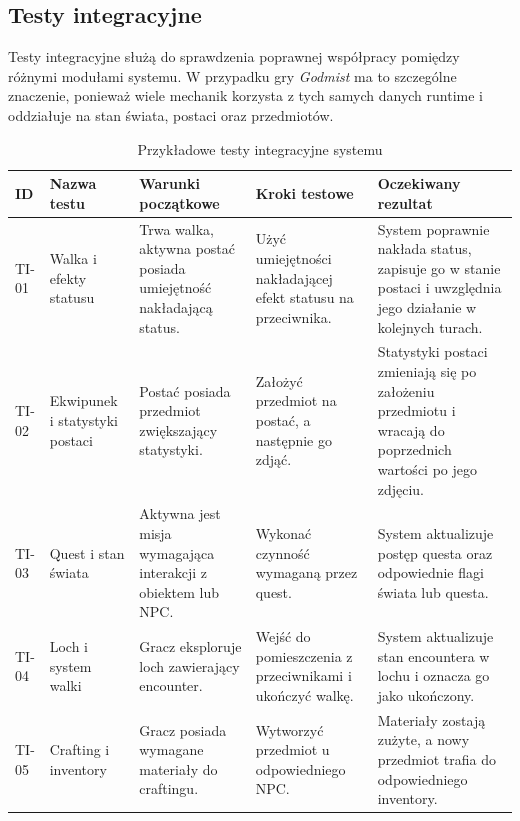 \subsection{Testy integracyjne}
\label{subsec:testy-integracyjne}

Testy integracyjne służą do sprawdzenia poprawnej współpracy pomiędzy różnymi modułami systemu. W przypadku gry \emph{Godmist} ma to szczególne znaczenie, ponieważ wiele mechanik korzysta z tych samych danych runtime i oddziałuje na stan świata, postaci oraz przedmiotów.

\begin{table}[H]
\centering
\caption{Przykładowe testy integracyjne systemu}
\label{tab:testy-integracyjne}
\begin{threeparttable}
\begin{tabularx}{\linewidth}{|p{1.6cm}|p{3.2cm}|X|X|X|}
\hline
\textbf{ID} & \textbf{Nazwa testu} & \textbf{Warunki początkowe} & \textbf{Kroki testowe} & \textbf{Oczekiwany rezultat} \\
\hline
TI-01 & Walka i efekty statusu & Trwa walka, aktywna postać posiada umiejętność nakładającą status. & Użyć umiejętności nakładającej efekt statusu na przeciwnika. & System poprawnie nakłada status, zapisuje go w stanie postaci i uwzględnia jego działanie w kolejnych turach. \\
\hline
TI-02 & Ekwipunek i statystyki postaci & Postać posiada przedmiot zwiększający statystyki. & Założyć przedmiot na postać, a następnie go zdjąć. & Statystyki postaci zmieniają się po założeniu przedmiotu i wracają do poprzednich wartości po jego zdjęciu. \\
\hline
TI-03 & Quest i stan świata & Aktywna jest misja wymagająca interakcji z obiektem lub NPC. & Wykonać czynność wymaganą przez quest. & System aktualizuje postęp questa oraz odpowiednie flagi świata lub questa. \\
\hline
TI-04 & Loch i system walki & Gracz eksploruje loch zawierający encounter. & Wejść do pomieszczenia z przeciwnikami i ukończyć walkę. & System aktualizuje stan encountera w lochu i oznacza go jako ukończony. \\
\hline
TI-05 & Crafting i inventory & Gracz posiada wymagane materiały do craftingu. & Wytworzyć przedmiot u odpowiedniego NPC. & Materiały zostają zużyte, a nowy przedmiot trafia do odpowiedniego inventory. \\
\hline
\end{tabularx}
\end{threeparttable}
\end{table}

